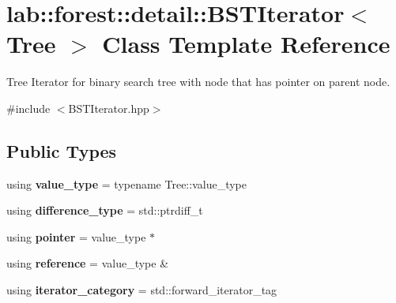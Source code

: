 \hypertarget{classlab_1_1forest_1_1detail_1_1BSTIterator}{}\section{lab\+:\+:forest\+:\+:detail\+:\+:B\+S\+T\+Iterator$<$ Tree $>$ Class Template Reference}
\label{classlab_1_1forest_1_1detail_1_1BSTIterator}


Tree Iterator for binary search tree with node that has pointer on parent node.  




{\ttfamily \#include $<$B\+S\+T\+Iterator.\+hpp$>$}

\subsection*{Public Types}
\begin{DoxyCompactItemize}
\item 
\mbox{\label{classlab_1_1forest_1_1detail_1_1BSTIterator_a7357b7240b452c85e8067df208ec89d4}} 
using {\bfseries value\+\_\+type} = typename Tree\+::value\+\_\+type
\item 
\mbox{\label{classlab_1_1forest_1_1detail_1_1BSTIterator_a4f51d149bf76cc57d448890cc0a1847b}} 
using {\bfseries difference\+\_\+type} = std\+::ptrdiff\+\_\+t
\item 
\mbox{\label{classlab_1_1forest_1_1detail_1_1BSTIterator_a25fcc22982fc156230809c1562b4acd3}} 
using {\bfseries pointer} = value\+\_\+type $\ast$
\item 
\mbox{\label{classlab_1_1forest_1_1detail_1_1BSTIterator_a7e8e336f4827a4346403bc968d5c0b55}} 
using {\bfseries reference} = value\+\_\+type \&
\item 
\mbox{\label{classlab_1_1forest_1_1detail_1_1BSTIterator_ae388f96c31ed50439124acf7cdd7f2d5}} 
using {\bfseries iterator\+\_\+category} = std\+::forward\+\_\+iterator\+\_\+tag
\end{DoxyCompactItemize}
